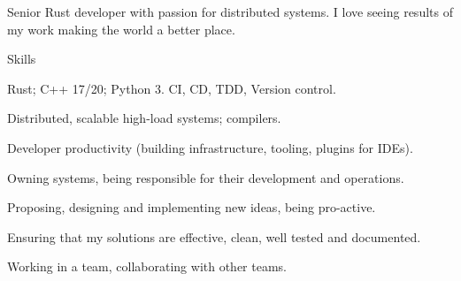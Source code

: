 \documentclass{resume}
\begin{document}
    Senior Rust developer with passion for distributed systems.
    I love seeing results of my work making the world a better place.

    

    \begin{rSection}{Skills}
        \begin{rSubsection}{}{}{}{}
            \item
                Rust;
                C++ 17/20;
                Python 3.
                CI, CD, TDD, Version control.
            \item
                Distributed, scalable high-load systems; compilers.
            \item
                Developer productivity
                (building infrastructure, tooling, plugins for IDEs).
        \end{rSubsection}
        \begin{rSubsection}{}{}{}{}
            \item
                Owning systems,
                being responsible for their development and operations.
            \item
                Proposing, designing and implementing new ideas,
                being pro-active.
            \item
                Ensuring that my solutions are
                effective, clean, well tested and documented.
            \item
                Working in a team,
                collaborating with other teams.
        \end{rSubsection}
    \end{rSection}
\end{document}
